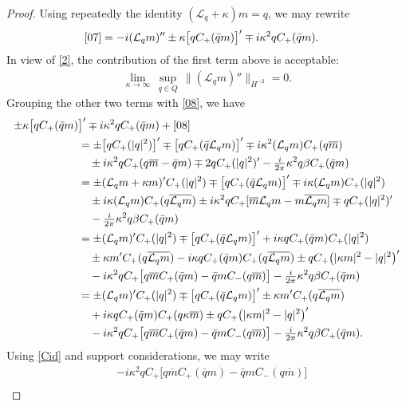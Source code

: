 \documentclass{amsart}
\numberwithin{equation}{section}
\theoremstyle{definition}
\newcommand{\ka}{\kappa}
\newcommand{\Lc}{\mathcal{L}}
\begin{document}
\begin{proof}
Using repeatedly the identity $(\Lc_q+\ka)m=q$, we may rewrite 
\begin{align*}
\eqref{07}&=-i(\Lc_qm)'' \pm \ka \bigl[q C_+(\bar{q}m)\bigr]'\mp i\ka^2 q C_+(\bar{q}m).
\end{align*}
In view of \eqref{2}, the contribution of the first term above is acceptable:
\begin{align*}
\lim_{\ka\to\infty}\,\sup_{q\in Q}\,\bigl\|(\Lc_qm)''\bigr\|_{H^{-2}} =0.
\end{align*}
Grouping the other two terms with \eqref{08}, we have
\begin{align}
\pm \ka \bigl[q  C_+(\bar{q}m)&\bigr]' \mp i\ka^2 q C_+(\bar{q}m) +\eqref{08} \notag\\
&= \pm \bigl[q C_+(|q|^2)\bigr]' \mp\bigl[q C_+(\bar q\Lc_qm)\bigr]'\mp  i\ka^2(\Lc_q m) C_+(q\overline{m})\notag\\
&\quad \pm i\ka^2q C_+(q\overline m -\bar q m)\mp2qC_+(|q|^2)'-\tfrac{i}{2\pi}\ka^2q\beta C_+(\bar q m)\notag\\
&=\pm (\Lc_qm+\ka m)'C_+(|q|^2)\mp\bigl[q C_+(\bar q \Lc_qm)\bigr]'\mp  i\ka(\Lc_q m)C_+(|q|^2)\notag\\
&\quad \pm i\ka (\Lc_qm)C_+(q\overline{\Lc_qm})\pm i\ka^2 q C_+[\overline m \Lc_qm - m \overline{\Lc_qm}]\mp qC_+(|q|^2)'\notag\\
&\quad-\tfrac{i}{2\pi}\ka^2q\beta C_+(\bar q m)\notag\\
&=\pm (\Lc_qm)'C_+(|q|^2)\mp\bigl[q C_+(\bar q \Lc_qm)\bigr]'+  i\ka q C_+(\bar q m) C_+(|q|^2)\notag\\
&\quad  \pm \ka m' C_+(q\overline{\Lc_qm})-i\ka q C_+(\bar q m) C_+(q\overline{\Lc_qm})\pm q C_+\bigl(|\ka m|^2-|q|^2\bigr)' \notag\\
&\quad-i\ka^2qC_+\bigl[q\overline{m} C_+(\bar q m) - \bar q m C_-(q\overline m)\bigr]-\tfrac{i}{2\pi}\ka^2q\beta C_+(\bar q m)\notag\\
&=\pm (\Lc_qm)'C_+(|q|^2)\mp\bigl[q C_+(\bar q \Lc_qm)\bigr]'\pm \ka m' C_+(q\overline{\Lc_qm})\label{1:07}\\
&\quad  +  i\ka q C_+(\bar q m) C_+(q\ka\overline{m})\pm q C_+\bigl(|\ka m|^2-|q|^2\bigr)' \notag\\
&\quad -i\ka^2qC_+\bigl[q\overline{m} C_+(\bar q m) - \bar q m C_-(q\overline m)\bigr]-\tfrac{i}{2\pi}\ka^2q\beta C_+(\bar q m).\notag
\end{align}
Using \eqref{Cid} and support considerations, we may write
\begin{align*}
&-i\ka^2qC_+\bigl[q\overline{m} C_+(\bar q m) - \bar q m C_-(q\overline m)\bigr]\\

\end{align*}
\end{proof}
\end{document}
